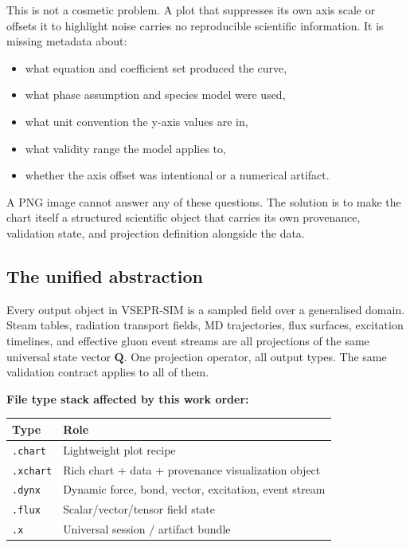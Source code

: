 \documentclass[11pt, a4paper, oneside]{article}
\newcommand{\Qvec}{\mathbf{Q}}           %
\begin{document}
This is not a cosmetic problem. A plot that suppresses its own axis scale or
offsets it to highlight noise carries no reproducible scientific information.
It is missing metadata about:

\begin{itemize}
  \item what equation and coefficient set produced the curve,
  \item what phase assumption and species model were used,
  \item what unit convention the y-axis values are in,
  \item what validity range the model applies to,
  \item whether the axis offset was intentional or a numerical artifact.
\end{itemize}

A PNG image cannot answer any of these questions. The solution is to make
the chart itself a structured scientific object that carries its own
provenance, validation state, and projection definition alongside the data.

\subsection{The unified abstraction}

Every output object in VSEPR-SIM is a sampled field over a generalised domain.
Steam tables, radiation transport fields, MD trajectories, flux surfaces,
excitation timelines, and effective gluon event streams are all projections of
the same universal state vector $\Qvec$. One projection operator, all output
types. The same validation contract applies to all of them.

\medskip
\noindent\textbf{File type stack affected by this work order:}

\begin{center}
\begin{tabular}{ll}
  \toprule
  Type & Role \\
  \midrule
  \texttt{.chart}  & Lightweight plot recipe \\
  \texttt{.xchart} & Rich chart + data + provenance visualization object \\
  \texttt{.dynx}   & Dynamic force, bond, vector, excitation, event stream \\
  \texttt{.flux}   & Scalar/vector/tensor field state \\
  \texttt{.x}      & Universal session / artifact bundle \\
  \bottomrule
\end{tabular}
\end{center}
\end{document}
